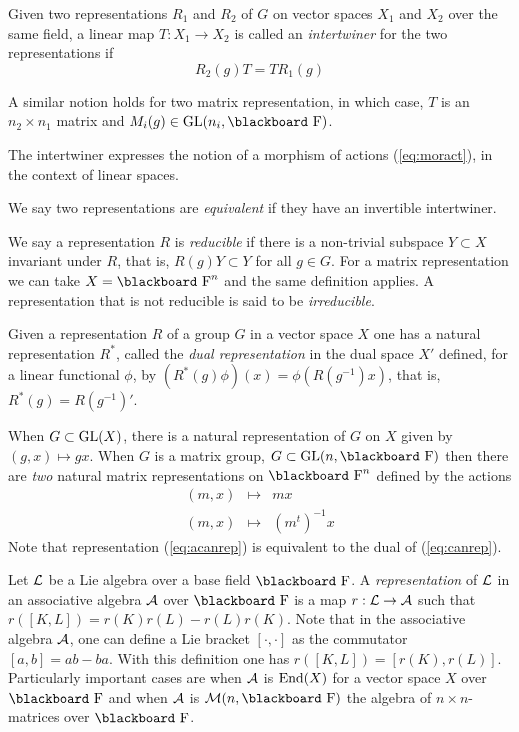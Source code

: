 \documentclass[12pt,titlepage]{article}
\def\bbf#1{\hbox{\blackboard #1}}
\def\lF{\bbf F}
\def\cA{{\cal A}}
\def\cL{{\cal L}}
\def\cM{{\cal M}}
\def\End{\hbox{End}}
\def\GL{\hbox{GL}}
\begin{document}
Given two representations \(R_1\) and \(R_2\) of \(G\) on vector spaces
\(X_1\) and \(X_2\) over the same field, a linear map \(T:X_1 \to X_2\)
is called an {\em intertwiner\/}
%
%
 for the two representations if
\begin{equation} \label{eq:intertw}
R_2(g)T = TR_1(g)
\end{equation}%


A similar notion holds for two matrix representation, in which case,
\(T\) is an \(n_2\times n_1\) matrix and \(M_i(g) \in \GL(n_i,\lF)\).

The intertwiner expresses the notion of a morphism of 
actions (\ref{eq:moract}), in the context of linear spaces.


We say two representations are {\em equivalent\/}
%
 if they have an invertible 
intertwiner. 

We say a representation \(R\) is {\em reducible\/}
%
 if there is a non-trivial subspace \(Y\subset X\) 
invariant under \(R\), that is,
\(R(g)Y\subset Y\) for all \(g\in G\). For a matrix representation we
can take \(X=\lF^n\) and the same definition applies. A representation
that is not reducible is said to be {\em irreducible\/}.
%




Given a representation \(R\) of a group \(G\) in a vector space \(X\)
one has a natural representation \(R^*\), called the 
{\em dual representation\/}
%
 in the dual space \(X'\)
defined, for a linear functional \(\phi\), 
by \((R^*(g)\phi)(x)=\phi(R(g^{-1})x)\),
% 
that is, \(R^*(g)=R(g^{-1})'\).

When \(G\subset \GL(X)\), there is a natural representation of \(G\) on
\(X\) given by \((g, x) \mapsto gx\).
When \(G\) is a matrix group, \(G \subset \GL(n,\lF)\) then there are
{\em two\/}  natural matrix representations on \(\lF^n\) 
defined by the actions 
\begin{eqnarray}\label{eq:canrep}(m,x) & \mapsto & mx \\ \label{eq:acanrep}
(m,x) & \mapsto & (m^t)^{-1} x
\end{eqnarray}%
Note that
representation (\ref{eq:acanrep}) is 
equivalent to the dual of (\ref{eq:canrep}). 


Let \(\cL\) be a Lie algebra over a base field \(\lF\). 
A {\em representation\/}
%
 of \(\cL\) in an
associative algebra \(\cA\) over \(\lF\) is a map 
\(r:\cL \to \cA\) such that
\(r([K,L]) =r(K)r(L)-r(L)r(K).\) Note that in the
associative algebra \(\cA\), one can define a Lie bracket \([\cdot,\cdot]\)
as the commutator \([a,b]=ab-ba\). With this definition one has 
\(r([K,L])=[r(K),r(L)]\).
Particularly important cases are when
\(\cA\) is \(\End(X)\) for a vector space \(X\) over \(\lF\)
and when \(\cA\) is
\(\cM(n,\lF)\) the algebra of \(n\times n\)-matrices over
\(\lF\).
\end{document}
